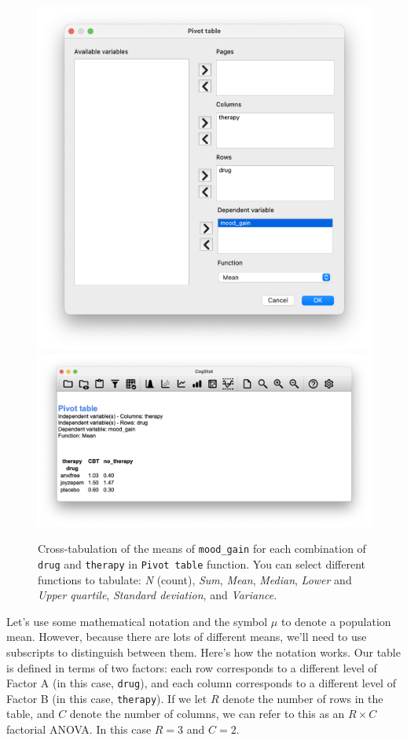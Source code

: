 \documentclass[
  11pt,
  a4paper,
  twoside,symmetric,openright]{book}
\theoremstyle{break}
\theoremstyle{break}
\begin{document}
\begin{figure}

{\centering \includegraphics[width=0.6\linewidth]{resources/image/cogstatpivotclinicaldialog} \includegraphics[width=0.6\linewidth]{resources/image/cogstatpivotclinicalpivot} 

}

\caption{Cross-tabulation of the means of \texttt{mood\_gain} for each combination of \texttt{drug} and \texttt{therapy} in \texttt{Pivot\ table} function. You can select different functions to tabulate: \emph{N} (count), \emph{Sum}, \emph{Mean}, \emph{Median}, \emph{Lower} and \emph{Upper quartile}, \emph{Standard deviation}, and \emph{Variance}.}\label{fig:anova2clinicalpivot}
\end{figure}

Let's use some mathematical notation and the symbol \(\mu\) to denote a population mean. However, because there are lots of different means, we'll need to use subscripts to distinguish between them. Here's how the notation works. Our table is defined in terms of two factors: each row corresponds to a different level of Factor A (in this case, \texttt{drug}), and each column corresponds to a different level of Factor B (in this case, \texttt{therapy}). If we let \(R\) denote the number of rows in the table, and \(C\) denote the number of columns, we can refer to this as an \(R \times C\) factorial ANOVA. In this case \(R=3\) and \(C=2\).
\end{document}
